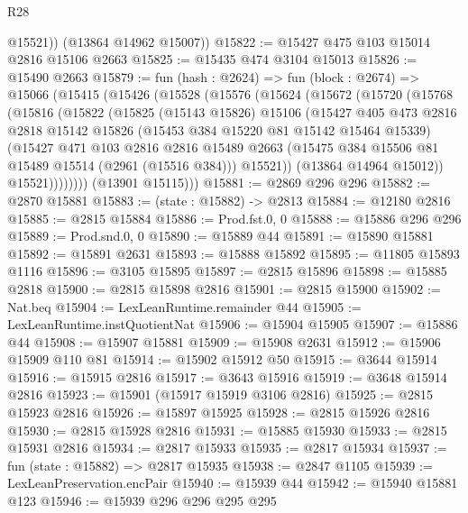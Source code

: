 \begin{lexlean}{R28}
\begin{coremodule}
          @15521))
      (@13864 @14962 @15007))
@15822 := @15427 @475 @103 @15014 @2816 @15106 @2663
@15825 := @15435 @474 @3104 @15013
@15826 := @15490 @2663
@15879 := fun (hash : @2624) =>
  fun (block : @2674) =>
  @15066
    (@15415
      (@15426
        (@15528
          (@15576
            (@15624
              (@15672
                (@15720
                  (@15768
                    (@15816
                      (@15822
                        (@15825
                          (@15143 @15826)
                          @15106
                          (@15427
                            @405
                            @473
                            @2816
                            @2818
                            @15142
                            @15826
                            (@15453 @384 @15220 @81 @15142 @15464 @15339)
                            (@15427
                              @471
                              @103
                              @2816
                              @2816
                              @15489
                              @2663
                              (@15475 @384 @15506 @81 @15489 @15514 (@2961 (@15516 @384)))
                              @15521))
                          (@13864 @14964 @15012))
                        @15521))))))))
        (@13901 @15115)))
@15881 := @2869 @296 @296
@15882 := @2870 @15881
@15883 := (state : @15882) -> @2813
@15884 := @12180 @2816
@15885 := @2815 @15884
@15886 := Prod.fst.{0, 0}
@15888 := @15886 @296 @296
@15889 := Prod.snd.{0, 0}
@15890 := @15889 @44
@15891 := @15890 @15881
@15892 := @15891 @2631
@15893 := @15888 @15892
@15895 := @11805 @15893 @1116
@15896 := @3105 @15895
@15897 := @2815 @15896
@15898 := @15885 @2818
@15900 := @2815 @15898 @2816
@15901 := @2815 @15900
@15902 := Nat.beq
@15904 := LexLeanRuntime.remainder @44
@15905 := LexLeanRuntime.instQuotientNat
@15906 := @15904 @15905
@15907 := @15886 @44
@15908 := @15907 @15881
@15909 := @15908 @2631
@15912 := @15906 @15909 @110 @81
@15914 := @15902 @15912 @50
@15915 := @3644 @15914
@15916 := @15915 @2816
@15917 := @3643 @15916
@15919 := @3648 @15914 @2816
@15923 := @15901 (@15917 @15919 @3106 @2816)
@15925 := @2815 @15923 @2816
@15926 := @15897 @15925
@15928 := @2815 @15926 @2816
@15930 := @2815 @15928 @2816
@15931 := @15885 @15930
@15933 := @2815 @15931 @2816
@15934 := @2817 @15933
@15935 := @2817 @15934
@15937 := fun (state : @15882) => @2817 @15935
@15938 := @2847 @1105
@15939 := LexLeanPreservation.encPair
@15940 := @15939 @44
@15942 := @15940 @15881 @123
@15946 := @15939 @296 @296 @295 @295

\end{coremodule}
\end{lexlean}
